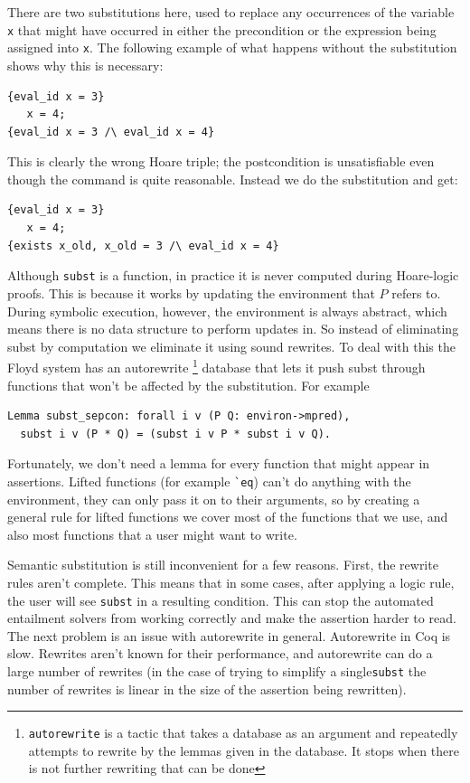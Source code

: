 \documentclass{puthesis}
\begin{document}
There are two substitutions here, used to replace any occurrences of
the variable \lstinline|x| that might have occurred in either the
precondition or the expression being assigned into \lstinline|x|. The
following example of what happens without the substitution shows why
this is necessary:

\begin{lstlisting}
{eval_id x = 3}
   x = 4;
{eval_id x = 3 /\ eval_id x = 4}
\end{lstlisting}

This is clearly the wrong Hoare triple; the postcondition is
unsatisfiable even though the command is quite reasonable. Instead we
do the substitution and get:

\begin{lstlisting}
{eval_id x = 3}
   x = 4;
{exists x_old, x_old = 3 /\ eval_id x = 4}
\end{lstlisting}

Although \lstinline|subst| is a function, in practice it is never
computed during Hoare-logic proofs.  This is because it works by
updating the environment that $P$ refers to. During symbolic
execution, however, the environment is always abstract, which means
there is no data structure to perform updates in. So instead of
eliminating subst by computation we eliminate it using sound rewrites.
To deal with this the Floyd system has an autorewrite
\footnote{\lstinline|autorewrite| is a tactic
  that takes a database as an argument and repeatedly attempts to
  rewrite by the lemmas given in the database. It stops when there is
  not further rewriting that can be done}
database that lets it push subst through
functions that won't be affected by the substitution. For example

\begin{lstlisting}
Lemma subst_sepcon: forall i v (P Q: environ->mpred),
  subst i v (P * Q) = (subst i v P * subst i v Q).
\end{lstlisting}

Fortunately, we don't need a lemma for every function that might
appear in assertions. Lifted functions (for example \lstinline|`eq|)
can't do anything with the environment, they can only pass it on to
their arguments, so by creating a general rule for lifted functions we
cover most of the functions that we use, and also most functions that
a user might want to write.

Semantic substitution is still inconvenient for a few reasons. First,
the rewrite rules aren't complete. This means that in some cases,
after applying a logic rule, the user will see \lstinline|subst| in a
resulting condition. This can stop the automated entailment solvers
from working correctly and make the assertion harder to read. The next
problem is an issue with autorewrite in general.  Autorewrite in Coq
is slow. Rewrites aren't known for their performance, and autorewrite
can do a large number of rewrites (in the case of trying to simplify a
single\lstinline|subst| the number of rewrites is linear in the size
of the assertion being rewritten).
\end{document}
